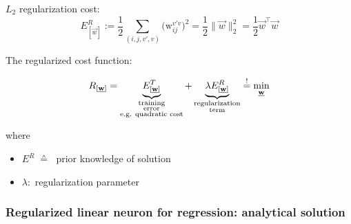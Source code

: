 \begin{frame}

$L_2$ regularization cost:
\begin{equation}
E^R_{[\vec w]} := \frac{1}{2} \sum_{(i, j, v', v)} 
			\big( \mathrm{w}_{ij}^{v'v} \big)^2 = \frac{1}{2} \lVert \vec w \rVert_2^2 = \frac{1}{2} \vec w^\top \vec w 
\end{equation}
\renewcommand{\CancelColor}{\color{gray}}


The regularized cost function:

\begin{equation}
	R_{[\underline{\mathbf{w}}]} = \underbrace{ E_{[\underline{\mathbf{w}}]}^T }_{
			\substack{\text{training} \\ \text{error} \\ \text{e.g. quadratic cost}}}
		+ \underbrace{ \lambda E_{[\underline{\mathbf{w}}]}^R }_{
			\substack{\text{regularization} \\ \text{term}}}
		\stackrel{\mathrm{!}}{=} \min_{\underline{\mathbf{w}}}
\end{equation}

where 
\begin{itemize}
	\item $E^R \; \corresponds \; $ prior knowledge of solution
	\item $\lambda:$ regularization parameter 
\end{itemize}

\end{frame}

\subsubsection{Regularized linear neuron for regression: analytical solution}

